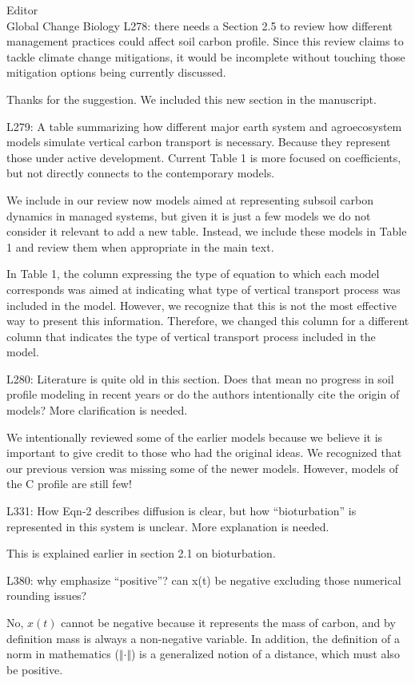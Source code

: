 \documentclass[11pt]{bgcletter}
\newcommand{\answer}[1] {
{\color{cyan} #1}
}
\begin{document}
\begin{letter}{Editor\\
   Global Change Biology
}
L278: there needs a Section 2.5 to review how different management practices could affect soil carbon profile. Since this review claims to tackle climate change mitigations, it would be incomplete without touching those mitigation options being currently discussed.

\answer{Thanks for the suggestion. We included this new section in the manuscript. }

L279: A table summarizing how different major earth system and agroecosystem models simulate vertical carbon transport is necessary. Because they represent those under active development. Current Table 1 is more focused on coefficients, but not directly connects to the contemporary models.

\answer{We include in our review now models aimed at representing subsoil carbon dynamics in managed systems, but given it is just a few models we do not consider it relevant to add a new table. Instead, we include these models in Table 1 and review them when appropriate in the main text.

In Table 1, the column expressing the type of equation to which each model corresponds was aimed at indicating what type of vertical transport process was included in the model. However, we recognize that this is not the most effective way to present this information. Therefore, we changed this column for a different column that indicates the type of vertical transport process included in the model.}

L280: Literature is quite old in this section. Does that mean no progress in soil profile modeling in recent years or do the authors intentionally cite the origin of models? More clarification is needed.

\answer{We intentionally reviewed some of the earlier models because we believe it is important to give credit to those who had the original ideas. We recognized that our previous version was missing some of the newer models. However, models of the C profile are still few!}

L331: How Eqn-2 describes diffusion is clear, but how ``bioturbation'' is represented in this system is unclear. More explanation is needed.

\answer{This is explained earlier in section 2.1 on bioturbation.}

L380: why emphasize ``positive''? can x(t) be negative excluding those numerical rounding issues? 

\answer{No, $x(t)$ cannot be negative because it represents the mass of carbon, and by definition mass is always a non-negative variable. In addition, the definition of a norm in mathematics ($\Vert \cdot \Vert$) is a generalized notion of a distance, which must also be positive. }


\end{letter}
\end{document}

